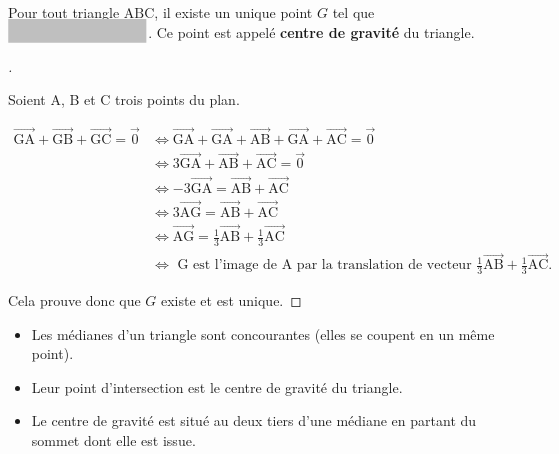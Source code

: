 \documentclass[12pt]{article}
\theoremstyle{break}
\newenvironment{demo}[1][\proofname]{%
  \begin{proof}[#1]$ $\newline
  }{%
  \end{proof}
}
\begin{document}
\begin{proposition}{}{}
Pour tout triangle $\mathrm{ABC}$, il existe un unique point $G$ tel que $\hideM{\overrightarrow{\mathrm{GA}}+\overrightarrow{\mathrm{GB}}+\overrightarrow{\mathrm{GC}}=\overrightarrow{0}}$. Ce point est appelé \textbf{centre de gravité} du triangle.
\end{proposition}

\begin{demo}
Soient A, B et C trois points du plan.

$$
\begin{aligned}
  \overrightarrow{\mathrm{GA}}+\overrightarrow{\mathrm{GB}}+\overrightarrow{\mathrm{GC}}=\overrightarrow{0} & \Longleftrightarrow \overrightarrow{\mathrm{GA}}+\overrightarrow{\mathrm{GA}}+\overrightarrow{\mathrm{AB}}+\overrightarrow{\mathrm{GA}}+\overrightarrow{\mathrm{AC}}=\overrightarrow{0} \\
  & \Longleftrightarrow 3 \overrightarrow{\mathrm{GA}}+\overrightarrow{\mathrm{AB}}+\overrightarrow{\mathrm{AC}}=\overrightarrow{0} \\
  & \Longleftrightarrow-3 \overrightarrow{\mathrm{GA}}=\overrightarrow{\mathrm{AB}}+\overrightarrow{\mathrm{AC}} \\
  & \Longleftrightarrow 3 \overrightarrow{\mathrm{AG}}=\overrightarrow{\mathrm{AB}}+\overrightarrow{\mathrm{AC}} \\
  & \Longleftrightarrow \overrightarrow{\mathrm{AG}}=\frac{1}{3} \overrightarrow{\mathrm{AB}}+\frac{1}{3} \overrightarrow{\mathrm{AC}} \\
  & \Longleftrightarrow \text { G est l'image de A par la translation de vecteur } \frac{1}{3} \overrightarrow{\mathrm{AB}}+\frac{1}{3} \overrightarrow{\mathrm{AC}} .
\end{aligned}
$$

Cela prouve donc que $G$ existe et est unique.
\end{demo}

\begin{proposition}{}{}
\begin{itemize}
  \item Les médianes d'un triangle sont concourantes (elles se coupent en un même point).
  \item Leur point d'intersection est le centre de gravité du triangle.
  \item Le centre de gravité est situé au deux tiers d'une médiane en partant du sommet dont elle est issue.
\end{itemize}
\end{proposition}
\end{document}
